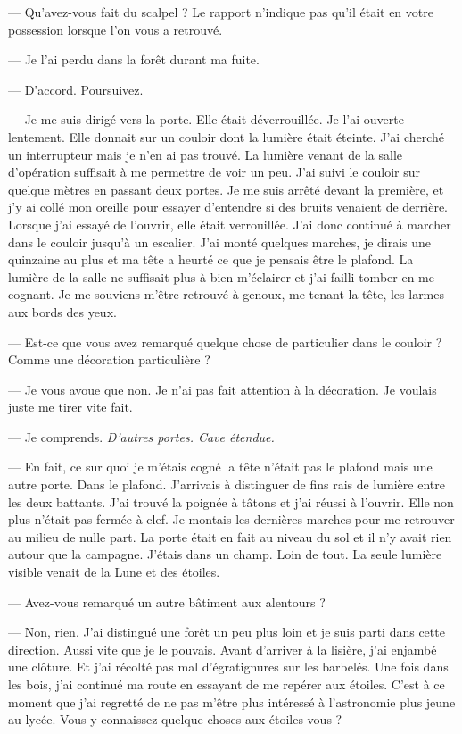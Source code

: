 — Qu'avez-vous fait du scalpel ? Le rapport n'indique pas qu'il était en votre possession lorsque l'on vous a retrouvé.

— Je l'ai perdu dans la forêt durant ma fuite.

— D'accord. Poursuivez.

— Je me suis dirigé vers la porte. Elle était déverrouillée. Je l'ai ouverte lentement. Elle donnait sur un couloir
dont la lumière était éteinte. J'ai cherché un interrupteur mais je n'en ai pas trouvé. La lumière venant de la
salle d'opération suffisait à me permettre de voir un peu. J'ai suivi le couloir sur quelque mètres en passant deux
portes. Je me suis arrêté devant la première, et j'y ai collé mon oreille pour essayer d'entendre si des bruits venaient
de derrière. Lorsque j'ai essayé de l'ouvrir, elle était verrouillée. J'ai donc continué à marcher dans le couloir
jusqu'à un escalier. J'ai monté quelques marches, je dirais une quinzaine au plus et ma tête a heurté ce que je pensais
être le plafond. La lumière de la salle ne suffisait plus à bien m'éclairer et j'ai failli tomber en me cognant. Je me
souviens m'être retrouvé à genoux, me tenant la tête, les larmes aux bords des yeux.

— Est-ce que vous avez remarqué quelque chose de particulier dans le couloir ? Comme une décoration particulière ?

— Je vous avoue que non. Je n'ai pas fait attention à la décoration. Je voulais juste me tirer vite fait.

— Je comprends. \emph{D'autres portes. Cave étendue.}

— En fait, ce sur quoi je m'étais cogné la tête n'était pas le plafond mais une autre porte. Dans le plafond. J'arrivais
à distinguer de fins rais de lumière entre les deux battants. J'ai trouvé la poignée à tâtons et j'ai réussi à l'ouvrir.
Elle non plus n'était pas fermée à clef. Je montais les dernières marches pour me retrouver au milieu de nulle part. La
porte était en fait au niveau du sol et il n'y avait rien autour que la campagne. J'étais dans un champ. Loin de tout.
La seule lumière visible venait de la Lune et des étoiles.

— Avez-vous remarqué un autre bâtiment aux alentours ?

— Non, rien. J'ai distingué une forêt un peu plus loin et je suis parti dans cette direction. Aussi vite que je le
pouvais. Avant d'arriver à la lisière, j'ai enjambé une clôture. Et j'ai récolté pas mal d'égratignures sur les
barbelés. Une fois dans les bois, j'ai continué ma route en essayant de me repérer aux étoiles. C'est à ce moment que
j'ai regretté de ne pas m'être plus intéressé à l'astronomie plus jeune au lycée. Vous y connaissez quelque choses aux
étoiles vous ?

